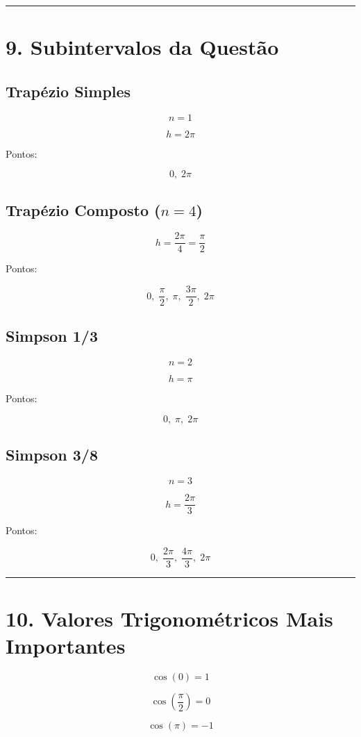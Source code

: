 \documentclass[12pt,a4paper]{article}
\begin{document}
\hrule

\section*{9. Subintervalos da Questão}

\subsection*{Trapézio Simples}

\[
n=1
\]

\[
h=2\pi
\]

Pontos:

\[
0,\;2\pi
\]

\subsection*{Trapézio Composto (\(n=4\))}

\[
h=\frac{2\pi}{4}
=
\frac{\pi}{2}
\]

Pontos:

\[
0,\;
\frac{\pi}{2},\;
\pi,\;
\frac{3\pi}{2},\;
2\pi
\]

\subsection*{Simpson 1/3}

\[
n=2
\]

\[
h=\pi
\]

Pontos:

\[
0,\;
\pi,\;
2\pi
\]

\subsection*{Simpson 3/8}

\[
n=3
\]

\[
h=\frac{2\pi}{3}
\]

Pontos:

\[
0,\;
\frac{2\pi}{3},\;
\frac{4\pi}{3},\;
2\pi
\]

\hrule

\section*{10. Valores Trigonométricos Mais Importantes}

\[
\cos(0)=1
\]

\[
\cos\left(\frac{\pi}{2}\right)=0
\]

\[
\cos(\pi)=-1
\]
\end{document}

